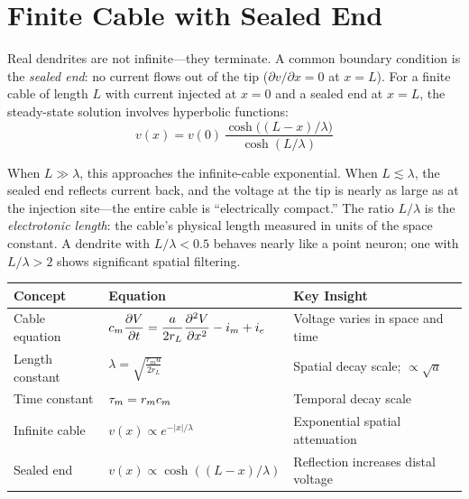\section{Finite Cable with Sealed End}
\label{sec:sealed-end}

Real dendrites are not infinite---they terminate. A common boundary condition is the \emph{sealed end}: no current flows out of the tip ($\partial v/\partial x = 0$ at $x = L$). For a finite cable of length $L$ with current injected at $x = 0$ and a sealed end at $x = L$, the steady-state solution involves hyperbolic functions:
%
\begin{equation}
  v(x) = v(0)\,\frac{\cosh\bigl((L - x)/\lambda\bigr)}{\cosh(L/\lambda)}
  \label{eq:sealed-end}
\end{equation}

\noindent When $L \gg \lambda$, this approaches the infinite-cable exponential. When $L \lesssim \lambda$, the sealed end reflects current back, and the voltage at the tip is nearly as large as at the injection site---the entire cable is ``electrically compact.'' The ratio $L/\lambda$ is the \emph{electrotonic length}: the cable's physical length measured in units of the space constant. A dendrite with $L/\lambda < 0.5$ behaves nearly like a point neuron; one with $L/\lambda > 2$ shows significant spatial filtering.


\begin{chaptersummary}

\begin{center}
\renewcommand{\arraystretch}{1.6}
\begin{tabularx}{\textwidth}{@{}l X X@{}}
  \toprule
  \textbf{Concept} & \textbf{Equation} & \textbf{Key Insight} \\
  \midrule
  Cable equation &
  $\displaystyle c_m\frac{\partial V}{\partial t} = \frac{a}{2r_L}\frac{\partial^2 V}{\partial x^2} - i_m + i_e$ &
  Voltage varies in space and time \\
  Length constant &
  $\displaystyle \lambda = \sqrt{\frac{r_m a}{2r_L}}$ &
  Spatial decay scale; $\propto \sqrt{a}$ \\
  Time constant &
  $\tau_m = r_m c_m$ &
  Temporal decay scale \\
  Infinite cable &
  $v(x) \propto e^{-|x|/\lambda}$ &
  Exponential spatial attenuation \\
  Sealed end &
  $v(x) \propto \cosh((L\!-\!x)/\lambda)$ &
  Reflection increases distal voltage \\
  \bottomrule
\end{tabularx}
\end{center}

\end{chaptersummary}

